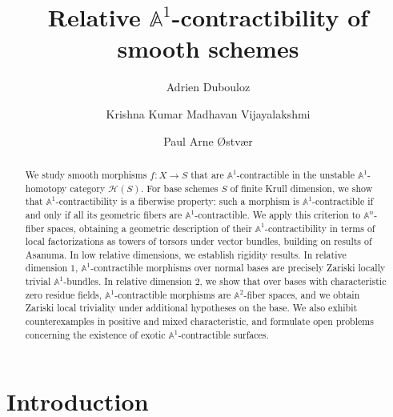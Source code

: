 \documentclass[10pt]{amsart}
\renewcommand{\AA}{\mathbb{A}}
\numberwithin{equation}{section} %
\theoremstyle{plain}
\theoremstyle{definition}
\theoremstyle{remark}
\begin{document}
\title{Relative $\AA^{1}$-contractibility of smooth schemes}
\author{Adrien Dubouloz}
\address{CNRS, Université de Poitiers, LMA, Poitiers, France  \& Université Bourgogne Europe, CNRS, IMB UMR 5584, 21000 Dijon, France}

\author{Krishna Kumar Madhavan Vijayalakshmi}
\address{Department of Mathematics ``F. Enriques'', University of Milan, Italy \& 
Université Bourgogne Europe, CNRS, IMB UMR 5584, 21000 Dijon, France }

\author{Paul Arne {\O}stv{\ae}r}
\address{Department of Mathematics ``F. Enriques'', University of Milan, Italy}


\begin{abstract}
We study smooth morphisms $f \colon X \to S$ that are $\mathbb{A}^1$-contractible in the unstable $\AA^1$-homotopy category $\mathcal{H}(S)$. For base schemes $S$ of finite Krull dimension, we show that $\AA^1$-contractibility is a fiberwise property: such a morphism is $\AA^1$-contractible if and only if all its geometric fibers are $\AA^1$-contractible. We apply this criterion to $\AA^n$-fiber spaces, obtaining a geometric description of their $\AA^1$-contractibility in terms of local factorizations as towers of torsors under vector bundles, building on results of Asanuma. In low relative dimensions, we establish rigidity results. In relative dimension $1$, $\AA^1$-contractible morphisms over normal bases are precisely Zariski locally trivial $\AA^1$-bundles. In relative dimension $2$, we show that over bases with characteristic zero residue fields, $\AA^1$-contractible morphisms are $\AA^2$-fiber spaces, and we obtain Zariski local triviality under additional hypotheses on the base. We also exhibit counterexamples in positive and mixed characteristic, and formulate open problems concerning the existence of exotic $\AA^1$-contractible surfaces.
\end{abstract}



\maketitle



\section*{Introduction} \label{sec:intro} 
\end{document}
